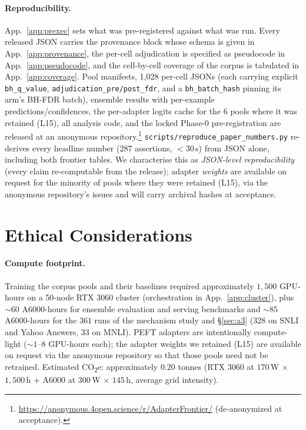 \documentclass[11pt]{article}
\begin{document}
\paragraph{Reproducibility.} App.~\ref{app:prexec} sets what was pre-registered against what was run. Every released JSON carries the provenance block whose schema is given in App.~\ref{app:provenance}, the per-cell adjudication is specified as pseudocode in App.~\ref{app:pseudocode}, and the cell-by-cell coverage of the corpus is tabulated in App.~\ref{app:coverage}. Pool manifests, 1{,}028 per-cell JSONs (each carrying explicit \texttt{bh\_q\_value}, \texttt{adjudication\_\allowbreak pre/\allowbreak post\_\allowbreak fdr}, and a \texttt{bh\_batch\_hash} pinning its arm's BH-FDR batch), ensemble results with per-example predictions/confidences, the per-adapter logits cache for the $6$ pools where it was retained (L15), all analysis code, and the locked Phase-0 pre-registration are released at an anonymous repository.\footnote{\url{https://anonymous.4open.science/r/AdapterFrontier/} (de-anonymized at acceptance).} \texttt{scripts/\allowbreak reproduce\_\allowbreak paper\_\allowbreak numbers.\allowbreak py} re-derives every headline number ($287$ assertions, ${<}30$\,s) from JSON alone, including both frontier tables. We characterise this as \emph{JSON-level reproducibility} (every claim re-computable from the release); adapter \emph{weights} are available on request for the minority of pools where they were retained (L15), via the anonymous repository's issues and will carry archival hashes at acceptance.

\section*{Ethical Considerations}

\paragraph{Compute footprint.} Training the corpus pools and their baselines required approximately $1{,}500$ GPU-hours on a 50-node RTX 3060 cluster (orchestration in App.~\ref{app:cluster}), plus $\sim$$60$ A6000-hours for ensemble evaluation and serving benchmarks and $\sim$$85$ A6000-hours for the $361$ runs of the mechanism study and \S\ref{sec:a3} ($328$ on SNLI and Yahoo Answers, $33$ on MNLI). PEFT adapters are intentionally compute-light ($\sim$$1$--$8$ GPU-hours each); the adapter weights we retained (L15) are available on request via the anonymous repository so that those pools need not be retrained. Estimated CO\textsubscript{2}e: approximately $0.20$ tonnes (RTX 3060 at $170$\,W $\times$ $1{,}500$\,h $+$ A6000 at $300$\,W $\times$ $145$\,h, average grid intensity).
\end{document}
